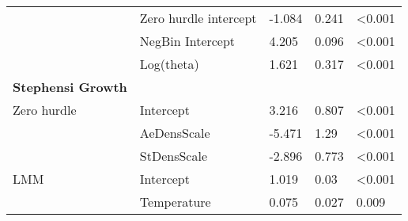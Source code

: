 \begin{table}[]
\begin{tabular}{lllll}
                             & Zero hurdle intercept           & -1.084                  & 0.241               & \textless0.001         \\
                             & NegBin Intercept                & 4.205                   & 0.096               & \textless0.001         \\
                             & Log(theta)                      & 1.621                   & 0.317               & \textless0.001         \\
\hline
\textbf{Stephensi Growth}    &                                 &                         &                     &                        \\
Zero hurdle                  & Intercept                       & 3.216                   & 0.807               & \textless0.001         \\
                             & AeDensScale                     & -5.471                  & 1.29                & \textless0.001         \\
                             & StDensScale                     & -2.896                  & 0.773               & \textless0.001         \\
LMM                          & Intercept                       & 1.019                   & 0.03                & \textless0.001         \\
                             & Temperature                     & 0.075                   & 0.027               & 0.009
\end{tabular}
\end{table}
